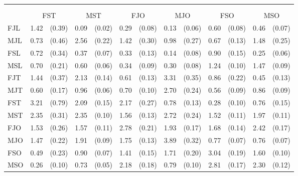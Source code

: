 \begin{tabular}{ll@{\,\,\,}rl@{\,\,\,}rl@{\,\,\,}rl@{\,\,\,}rl@{\,\,\,}rl@{\,\,\,}r}
\phantom{\textbf{Receiver}} &\\
\\
    & \multicolumn{2}{c}{\textnormal{FST}}
    & \multicolumn{2}{c}{\textnormal{MST}}
    & \multicolumn{2}{c}{\textnormal{FJO}}
    & \multicolumn{2}{c}{\textnormal{MJO}}
    & \multicolumn{2}{c}{\textnormal{FSO}}
    & \multicolumn{2}{c}{\textnormal{MSO}} \\
    \cmidrule(lr){2-3}
    \cmidrule(lr){4-5}
    \cmidrule(lr){6-7}
    \cmidrule(lr){8-9}
    \cmidrule(lr){10-11}
    \cmidrule(lr){12-13}
    \textnormal{FJL} & 1.42 & (0.39) & 0.09 & (0.02) & 0.29 & (0.08) & 0.13 & (0.06) & 0.60 & (0.08) & 0.46 & (0.07) \\
    \textnormal{MJL} & 0.73 & (0.46) & 2.56 & (0.22) & 1.42 & (0.30) & 0.98 & (0.27) & 0.67 & (0.13) & 1.48 & (0.25) \\
    \textnormal{FSL} & 0.72 & (0.34) & 0.37 & (0.07) & 0.33 & (0.13) & 0.14 & (0.08) & 0.90 & (0.15) & 0.25 & (0.06) \\
    \textnormal{MSL} & 0.70 & (0.21) & 0.60 & (0.06) & 0.34 & (0.09) & 0.30 & (0.08) & 1.24 & (0.10) & 1.47 & (0.09) \\
    \textnormal{FJT} & 1.44 & (0.37) & 2.13 & (0.14) & 0.61 & (0.13) & 3.31 & (0.35) & 0.86 & (0.22) & 0.45 & (0.13) \\
    \textnormal{MJT} & 0.60 & (0.17) & 0.96 & (0.06) & 0.70 & (0.10) & 2.70 & (0.24) & 0.56 & (0.09) & 0.86 & (0.09) \\
    \textnormal{FST} & 3.21 & (0.79) & 2.09 & (0.15) & 2.17 & (0.27) & 0.78 & (0.13) & 0.28 & (0.10) & 0.76 & (0.15) \\
    \textnormal{MST} & 2.35 & (0.31) & 2.35 & (0.10) & 1.56 & (0.13) & 2.72 & (0.24) & 1.52 & (0.11) & 1.97 & (0.11) \\
    \textnormal{FJO} & 1.53 & (0.26) & 1.57 & (0.11) & 2.78 & (0.21) & 1.93 & (0.17) & 1.68 & (0.14) & 2.42 & (0.17) \\
    \textnormal{MJO} & 1.47 & (0.22) & 1.91 & (0.09) & 1.75 & (0.13) & 3.89 & (0.32) & 0.77 & (0.07) & 0.76 & (0.07) \\
    \textnormal{FSO} & 0.49 & (0.23) & 0.90 & (0.07) & 1.41 & (0.15) & 1.71 & (0.20) & 3.04 & (0.19) & 1.60 & (0.10) \\
    \textnormal{MSO} & 0.26 & (0.10) & 0.73 & (0.05) & 2.18 & (0.18) & 0.79 & (0.10) & 2.81 & (0.17) & 2.30 & (0.12) \\
\bottomrule
\end{tabular}